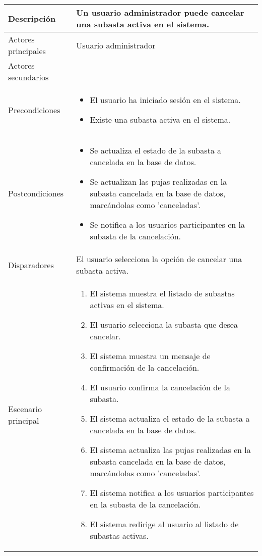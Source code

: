 \begin{longtable}{
    >{\columncolor{lightgreen!20}}p{4cm}
    p{12cm}
    }
    \midrule
    Descripción & Un usuario administrador puede cancelar una subasta activa en el sistema. \\
    \midrule
    Actores principales & Usuario administrador \\
    \midrule
    Actores secundarios &  \\
    \midrule
    Precondiciones & \begin{itemize}[nosep,leftmargin=*]
        \item El usuario ha iniciado sesión en el sistema.
        \item Existe una subasta activa en el sistema.
    \end{itemize} \\
    \midrule
    Postcondiciones & \begin{itemize}[nosep,leftmargin=*]
        \item Se actualiza el estado de la subasta a cancelada en la base de datos.
        \item Se actualizan las pujas realizadas en la subasta cancelada en la base de datos, marcándolas como 'canceladas'.
        \item Se notifica a los usuarios participantes en la subasta de la cancelación.
    \end{itemize} \\
    \midrule
    Disparadores & El usuario selecciona la opción de cancelar una subasta activa. \\
    \midrule
    Escenario principal & \begin{enumerate}[nosep,leftmargin=*]
        \item El sistema muestra el listado de subastas activas en el sistema.
        \item El usuario selecciona la subasta que desea cancelar.
        \item El sistema muestra un mensaje de confirmación de la cancelación.
        \item El usuario confirma la cancelación de la subasta.
        \item El sistema actualiza el estado de la subasta a cancelada en la base de datos.
        \item El sistema actualiza las pujas realizadas en la subasta cancelada en la base de datos, marcándolas como 'canceladas'.
        \item El sistema notifica a los usuarios participantes en la subasta de la cancelación.
        \item El sistema redirige al usuario al listado de subastas activas.

\end{enumerate}
\end{longtable}

